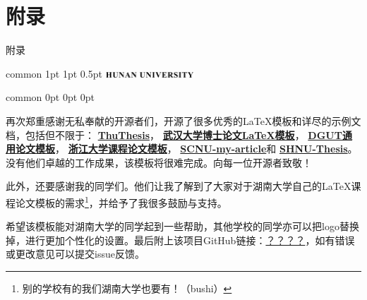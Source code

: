 \documentclass[
    report,     %
    oneside,    %
    UTF8,       %
    zihao=-4    %
]{config} %
\begin{document}



\begin{references}
\end{references}


\StartAppendix %

\chapter{附录}

附录


\Header
    {common} %
    {1pt} %
    {1pt} %
    {0.5pt} %
    {} %
    {\includegraphics[width=0.25\textwidth]{figures/logos/HNU-title-EN.png}} %
    {} %


\Footer
    {common} %
    {0pt} %
    {0pt} %
    {0pt} %
    {} %
    {\thepage} %
    {} %




\StartAcknowledgements %

再次郑重感谢无私奉献的开源者们，开源了很多优秀的\LaTeX{}模板和详尽的示例文档，包括但不限于：
\href{https://github.com/tuna/thuthesis}{\textbf{ThuThesis}}，
\href{http://aff.whu.edu.cn/huangzh/}{\textbf{武汉大学博士论文\LaTeX{}模板}}，
\href{https://www.overleaf.com/latex/templates/dguttong-yong-lun-wen-slash-bao-gao-slash-zuo-ye-mo-ban-fei-guan-fang/gkymcyhwhjhj}{\textbf{DGUT通用论文模板}}，
\href{https://www.overleaf.com/latex/templates/zhe-jiang-da-xue-ke-cheng-lun-wen-mo-ban/mjpzqvgsmdzn}{\textbf{浙江大学课程论文模板}}，
\href{https://www.overleaf.com/latex/templates/scnu-my-article/jkbbvhnddtsw}{\textbf{SCNU-my-article}}和
\href{https://www.overleaf.com/latex/templates/shnu-thesis/wsykzrksspgn}{\textbf{SHNU-Thesis}}。
没有他们卓越的工作成果，该模板将很难完成。向每一位开源者致敬！

此外，还要感谢我的同学们。他们让我了解到了大家对于湖南大学自己的\LaTeX{}课程论文模板的需求\footnote{别的学校有的我们湖南大学也要有！（bushi）}，并给予了我很多鼓励与支持。

希望该模板能对湖南大学的同学起到一些帮助，其他学校的同学亦可以把logo替换掉，进行更加个性化的设置。最后附上该项目GitHub链接：\url{？？？？}，如有错误或更改意见可以提交issue反馈。
\end{document}

